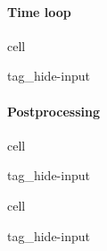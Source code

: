 \documentclass[letterpaper,10pt,english]{jupyterBook}
\begin{document}
\paragraph{Time loop}
\label{\detokenize{ch/pde/euler-quasi-1d:time-loop}}
\begin{sphinxuseclass}{cell}
\begin{sphinxuseclass}{tag_hide-input}
\end{sphinxuseclass}
\end{sphinxuseclass}

\paragraph{Post\sphinxhyphen{}processing}
\label{\detokenize{ch/pde/euler-quasi-1d:post-processing}}
\begin{sphinxuseclass}{cell}
\begin{sphinxuseclass}{tag_hide-input}
\end{sphinxuseclass}
\end{sphinxuseclass}
\begin{sphinxuseclass}{cell}
\begin{sphinxuseclass}{tag_hide-input}
\end{sphinxuseclass}
\end{sphinxuseclass}
\sphinxstepscope
\end{document}

